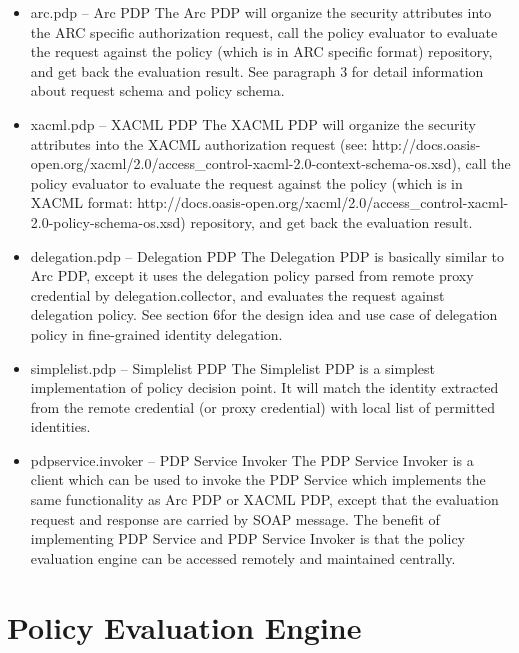\documentclass{article}                            %
\begin{document}
\begin{itemize}
    \item arc.pdp – Arc PDP
The Arc PDP will organize the security attributes into the ARC specific authorization request, call the policy evaluator to evaluate the request against the policy (which is in ARC specific format) repository, and get back the evaluation result. See paragraph 3 for detail information about request schema and policy schema.

    \item xacml.pdp – XACML PDP
The XACML PDP will organize the security attributes into the XACML authorization request (see: http://docs.oasis-open.org/xacml/2.0/access\_control-xacml-2.0-context-schema-os.xsd), call the policy evaluator to evaluate the request against the policy (which is in XACML format: http://docs.oasis-open.org/xacml/2.0/access\_control-xacml-2.0-policy-schema-os.xsd) repository, and get back the evaluation result.

    \item delegation.pdp – Delegation PDP
The Delegation PDP is basically similar to Arc PDP, except it uses the delegation policy parsed from remote proxy credential by delegation.collector, and evaluates the request against delegation policy. See section 6for the design idea and use case of delegation policy in fine-grained identity delegation.

    \item simplelist.pdp – Simplelist PDP
The Simplelist PDP is a simplest implementation of policy decision point. It will match the identity extracted from the remote credential (or proxy credential) with local list of permitted identities.

    \item pdpservice.invoker – PDP Service Invoker
The PDP Service Invoker is a client which can be used to invoke the PDP Service which implements the same functionality as Arc PDP or XACML PDP, except that the evaluation request and response are carried by SOAP message. The benefit of implementing PDP Service and PDP Service Invoker is that the policy evaluation engine can be accessed remotely and maintained centrally.

\end{itemize}




\section{Policy Evaluation Engine} %
\label{sec:policy_eval}
\end{document}
